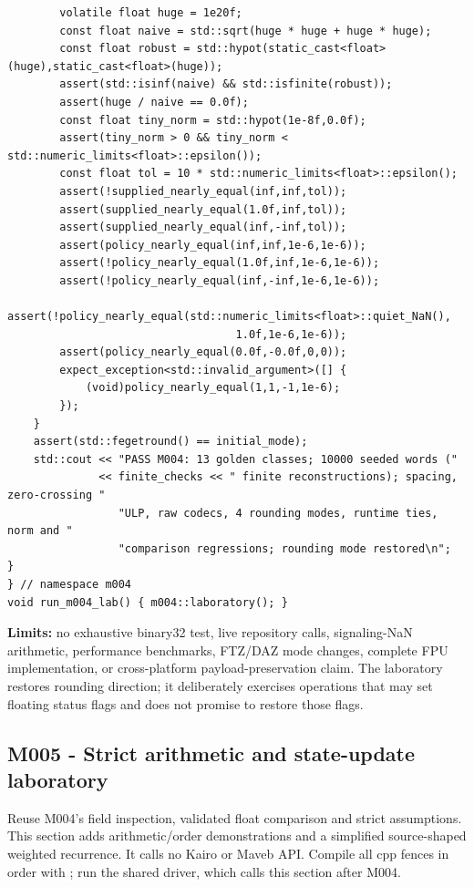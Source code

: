 \begin{verbatim}
        volatile float huge = 1e20f;
        const float naive = std::sqrt(huge * huge + huge * huge);
        const float robust = std::hypot(static_cast<float>(huge),static_cast<float>(huge));
        assert(std::isinf(naive) && std::isfinite(robust));
        assert(huge / naive == 0.0f);
        const float tiny_norm = std::hypot(1e-8f,0.0f);
        assert(tiny_norm > 0 && tiny_norm < std::numeric_limits<float>::epsilon());
        const float tol = 10 * std::numeric_limits<float>::epsilon();
        assert(!supplied_nearly_equal(inf,inf,tol));
        assert(supplied_nearly_equal(1.0f,inf,tol));
        assert(supplied_nearly_equal(inf,-inf,tol));
        assert(policy_nearly_equal(inf,inf,1e-6,1e-6));
        assert(!policy_nearly_equal(1.0f,inf,1e-6,1e-6));
        assert(!policy_nearly_equal(inf,-inf,1e-6,1e-6));
        assert(!policy_nearly_equal(std::numeric_limits<float>::quiet_NaN(),
                                   1.0f,1e-6,1e-6));
        assert(policy_nearly_equal(0.0f,-0.0f,0,0));
        expect_exception<std::invalid_argument>([] {
            (void)policy_nearly_equal(1,1,-1,1e-6);
        });
    }
    assert(std::fegetround() == initial_mode);
    std::cout << "PASS M004: 13 golden classes; 10000 seeded words ("
              << finite_checks << " finite reconstructions); spacing, zero-crossing "
                 "ULP, raw codecs, 4 rounding modes, runtime ties, norm and "
                 "comparison regressions; rounding mode restored\n";
}
} // namespace m004
void run_m004_lab() { m004::laboratory(); }
\end{verbatim}

\textbf{Limits:} no exhaustive binary32 test, live repository calls, signaling-NaN arithmetic, performance benchmarks, FTZ/DAZ mode changes, complete FPU implementation, or cross-platform payload-preservation claim. The laboratory restores rounding direction; it deliberately exercises operations that may set floating status flags and does not promise to restore those flags.

\subsection{M005 - Strict arithmetic and state-update laboratory}\label{appendix-4e2236f53445-m005---strict-arithmetic-and-state-update-laboratory}

\hypertarget{appendix-4e2236f53445-m005---strict-arithmetic-and-state-update-laboratory}{}

Reuse M004's field inspection, validated float comparison and strict assumptions. This section adds arithmetic/order demonstrations and a simplified source-shaped weighted recurrence. It calls no Kairo or Maveb API. Compile all cpp fences in order with ; run the shared driver, which calls this section after M004.

